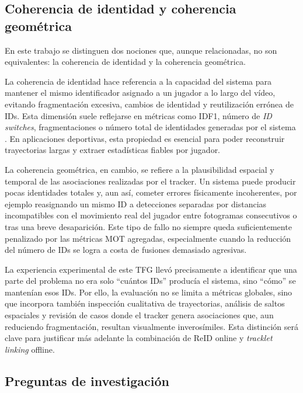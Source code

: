 \documentclass[../MAIN.tex]{subfiles}
\begin{document}
\subsection{Coherencia de identidad y coherencia geométrica}

En este trabajo se distinguen dos nociones que, aunque relacionadas, no son equivalentes: la coherencia de identidad y la coherencia geométrica.

La coherencia de identidad hace referencia a la capacidad del sistema para mantener el mismo identificador asignado a un jugador a lo largo del vídeo, evitando fragmentación excesiva, cambios de identidad y reutilización errónea de IDs. Esta dimensión suele reflejarse en métricas como IDF1, número de \textit{ID switches}, fragmentaciones o número total de identidades generadas por el sistema \parencite{ciaparrone2020survey,zhang2022bytetrack}. En aplicaciones deportivas, esta propiedad es esencial para poder reconstruir trayectorias largas y extraer estadísticas fiables por jugador.

La coherencia geométrica, en cambio, se refiere a la plausibilidad espacial y temporal de las asociaciones realizadas por el tracker. Un sistema puede producir pocas identidades totales y, aun así, cometer errores físicamente incoherentes, por ejemplo reasignando un mismo ID a detecciones separadas por distancias incompatibles con el movimiento real del jugador entre fotogramas consecutivos o tras una breve desaparición. Este tipo de fallo no siempre queda suficientemente penalizado por las métricas MOT agregadas, especialmente cuando la reducción del número de IDs se logra a costa de fusiones demasiado agresivas.

La experiencia experimental de este TFG llevó precisamente a identificar que una parte del problema no era solo “cuántos IDs” producía el sistema, sino “cómo” se mantenían esos IDs. Por ello, la evaluación no se limita a métricas globales, sino que incorpora también inspección cualitativa de trayectorias, análisis de saltos espaciales y revisión de casos donde el tracker genera asociaciones que, aun reduciendo fragmentación, resultan visualmente inverosímiles. Esta distinción será clave para justificar más adelante la combinación de ReID online y \textit{tracklet linking} offline.

\subsection{Preguntas de investigación}
\end{document}
